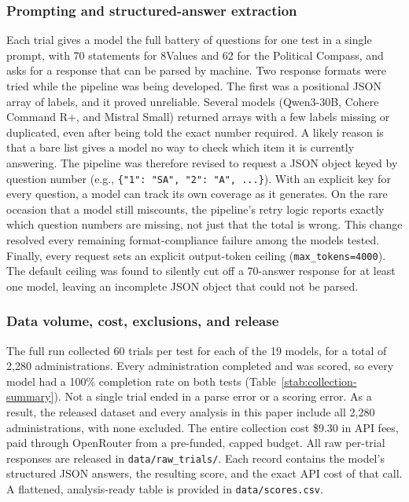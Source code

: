 \documentclass[12pt]{article}
\begin{document}
\subsubsection{Prompting and structured-answer extraction}
Each trial gives a model the full battery of questions for one test in a single prompt, with 70 statements
for 8Values and 62 for the Political Compass, and asks for a response that can be parsed by machine. Two
response formats were tried while the pipeline was being developed. The first was a positional JSON
array of labels, and it proved unreliable. Several models (Qwen3-30B, Cohere Command R+, and Mistral
Small) returned arrays with a few labels missing or duplicated, even after being told the exact number
required. A likely reason is that a bare list gives a model no way to check which item it is currently
answering. The pipeline was therefore revised to request a JSON object keyed by question number (e.g.,
\texttt{\{"1": "SA", "2": "A", ...\}}). With an explicit key for every question, a model can track its own coverage as it
generates. On the rare occasion that a model still miscounts, the pipeline's retry logic reports exactly
which question numbers are missing, not just that the total is wrong. This change resolved every
remaining format-compliance failure among the models tested. Finally, every request sets an explicit
output-token ceiling (\texttt{max\_tokens=4000}). The default ceiling was found to silently cut off a 70-answer
response for at least one model, leaving an incomplete JSON object that could not be parsed.

\subsubsection{Data volume, cost, exclusions, and release}
The full run collected 60 trials per test for each of the 19 models, for a total of 2{,}280 administrations.
Every administration completed and was scored, so every model had a 100\% completion rate on both
tests (Table~\ref{stab:collection-summary}). Not a single trial ended in a parse error or a scoring error. As a result, the released
dataset and every analysis in this paper include all 2{,}280 administrations, with none excluded. The entire
collection cost \$9.30 in API fees, paid through OpenRouter from a pre-funded, capped budget. All raw
per-trial responses are released in \texttt{data/raw\_trials/}. Each record contains the model's structured JSON
answers, the resulting score, and the exact API cost of that call. A flattened, analysis-ready table is
provided in \texttt{data/scores.csv}.
\end{document}
